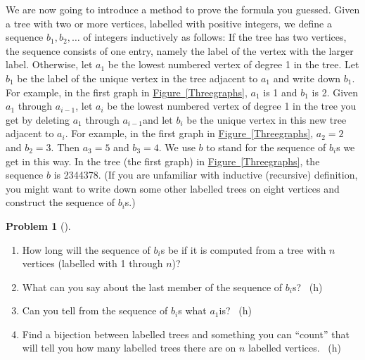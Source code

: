 \documentclass[10pt,]{book}
\theoremstyle{plain}
\theoremstyle{definition}
\newtheorem{activity}[project]{Problem}
\theoremstyle{definition}
\numberwithin{equation}{chapter}
\begin{document}
\hypertarget{p-634}{}%
We are now going to introduce a method to prove the formula you guessed. Given a tree with two or more vertices, labelled with positive integers, we define a sequence \(b_1,b_2,\ldots\) of integers inductively as follows: If the tree has two vertices, the sequence consists of one entry, namely the label of the vertex with the larger label. Otherwise, let \(a_1\) be the lowest numbered vertex of degree 1 in the tree. Let \(b_1\) be the label of the unique vertex in the tree adjacent to \(a_1\) and write down \(b_1\). For example, in the first graph in \hyperref[Threegraphs]{Figure~\ref{Threegraphs}}, \(a_1\) is 1 and \(b_1\) is 2. Given \(a_1\) through \(a_{i-1}\), let \(a_i\) be the lowest numbered vertex of degree 1 in the tree you get by deleting \(a_1\) through \(a_{i-1}\)and let \(b_i\) be the unique vertex in this new tree adjacent to \(a_i\). For example, in the first graph in \hyperref[Threegraphs]{Figure~\ref{Threegraphs}}, \(a_2=2\) and \(b_2=3\). Then \(a_3=5\) and \(b_3=4\). We use \(b\) to stand for the sequence of \(b_i\)s we get in this way. In the tree (the first graph) in \hyperref[Threegraphs]{Figure~\ref{Threegraphs}}, the sequence \(b\) is 2344378. (If you are unfamiliar with inductive (recursive) definition, you might want to write down some other labelled trees on eight vertices and construct the sequence of \(b_i\)s.)%
\begin{activity}[]\marginsymbol[-1em]{} \label{prufer-props}
\leavevmode%
\begin{enumerate}[font=\bfseries,label=(\alph*),ref=\alph*]
\item\label{task-95} \marginsymbol[-2.5em]{} \hypertarget{p-635}{}%
How long will the sequence of \(b_i\)s be if it is computed from a tree with \(n\) vertices (labelled with 1 through \(n\))?%
\item\label{task-96} \marginsymbol[-2.5em]{} \hypertarget{p-636}{}%
What can you say about the last member of the sequence of \(b_i\)s?%
~{\tiny (h)}\item\label{task-97} \marginsymbol[-2.5em]{} \hypertarget{p-638}{}%
Can you tell from the sequence of \(b_i\)s what \(a_1\)is?%
~{\tiny (h)}\item\label{task-98} \marginsymbol[-2.5em]{} \hypertarget{p-640}{}%
Find a bijection between labelled trees and something you can ``count'' that will tell you how many labelled trees there are on \(n\) labelled vertices.%
~{\tiny (h)}\end{enumerate}
\end{activity}
\hypertarget{p-642}{}%
\end{document}

